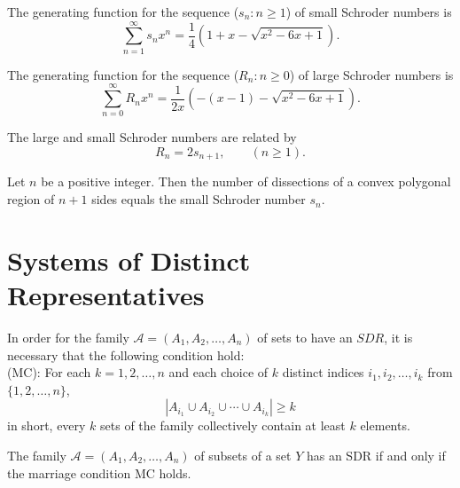 \begin{theorem}
  \label{thm:8.5.6}
  The generating function for the sequence ($s_n: n \geq 1$) of small Schroder numbers is
  \[\sum\limits_{n=1}^{\infty} s_n x^n=\frac{1}{4}\left(1+x-\sqrt{x^2-6 x+1}\right). \]
\end{theorem}

\begin{theorem}
  \label{thm:8.5.7}
  The generating function for the sequence ($R_n: n \geq 0$) of large Schroder numbers is
  \[\sum\limits_{n=0}^{\infty} R_n x^n=\frac{1}{2x}\left(-(x - 1)-\sqrt{x^2-6 x+1}\right). \]
\end{theorem}

\begin{corollary}
  \label{cor:8.5.8}
  The large and small Schroder numbers are related by
  \[ R_n = 2s_{n+1}, \qquad (n \geq 1). \]
\end{corollary}

\begin{theorem}
  \label{thm:8.5.9}
  Let $n$ be a positive integer. Then the number of dissections of a convex polygonal region of 
  $n + 1$ sides equals the small Schroder number $s_n$.
\end{theorem}

\chapter{Systems of Distinct Representatives}

\begin{theorem}
  \label{thm:9.2.1}
  In order for the family $\mathcal{A} = (A_1, A_2 ,\ldots , A_n)$ of sets to have an $SDR$, it is 
  necessary that the following condition hold:\\
  (MC): For each $k=1,2, \ldots, n$ and each choice of $k$ distinct indices $i_1, i_2, \ldots, i_k$ 
  from $\{1,2, \ldots, n\}$,
  \begin{equation}\label{9.1}
    \left|A_{i_1} \cup A_{i_2} \cup \cdots \cup A_{i_k}\right| \geq k  
  \end{equation}
  in short, every $k$ sets of the family collectively contain at least $k$ elements.
\end{theorem}

\begin{theorem}
  \label{thm:9.2.2}
  The family $\mathcal{A} = (A_1, A_2 ,\ldots , A_n)$ of subsets of a set $Y$ has an SDR if and only
  if the marriage condition MC holds.
\end{theorem}


